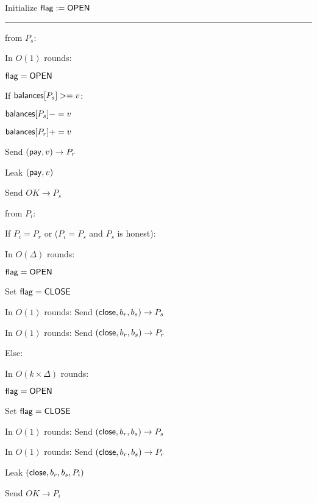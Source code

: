 \begin{bbox}[title={$\F_{\msf{pay}} (P_s, P_r, \msf{balances}, \Delta)$}]

Initialize ${\mathsf {flag}} := {\mathsf {OPEN}}$

\vspace{2mm} \hrule \vspace{2mm}

\OnInput {} from $P_s$:
	\begin{renumerate}
			\item In $O(1)$ rounds:  
				
				\quad \Require ${\mathsf {flag}} = {\mathsf {OPEN}}$
				
				\quad If ${\mathsf {balances}}[P_s] >= v$:
			
				\qquad ${\mathsf {balances}}[P_s] -= v$
				
				\qquad ${\mathsf {balances}}[P_r] += v$
				
				\qquad Send $({\mathsf {pay}}, v) \rightarrow P_r$

		\item Leak $({\mathsf {pay}}, v)$

		\item Send $OK \rightarrow P_s$

	\end{renumerate}

\OnInput {} from $P_i$:
	\begin{renumerate}	
		\item If $P_i = P_r$ or ($P_i = P_s$ and $P_s$ is honest):
			\begin{renumerate}
			\item In $O(\Delta)$ rounds:  

			\qquad \Require ${\mathsf {flag}} = {\mathsf {OPEN}}$

			\qquad Set ${\mathsf {flag}} = {\mathsf {CLOSE}}$

			\qquad In $O(1)$ rounds:  Send $({\mathsf {close}}, b_r, b_s) \rightarrow P_s$

			\qquad In $O(1)$ rounds: Send $({\mathsf {close}}, b_r, b_s) \rightarrow P_r$

			\end{renumerate}

		Else:
		\begin{renumerate}
			\item In $O(k \times \Delta)$ rounds:

			\qquad \Require ${\mathsf {flag}} = {\mathsf {OPEN}}$
			
			\qquad Set ${\mathsf {flag}} = {\mathsf {CLOSE}}$

			\qquad In $O(1)$ rounds:  Send $({\mathsf {close}}, b_r, b_s) \rightarrow P_s$

			\qquad In $O(1)$ rounds:  Send $({\mathsf {close}}, b_r, b_s) \rightarrow P_r$

		\end{renumerate}
		
		\item Leak $({\mathsf {close}}, b_r, b_s, P_i)$

		\item Send $OK \rightarrow P_i$
		
	\end{renumerate}

\end{bbox}
